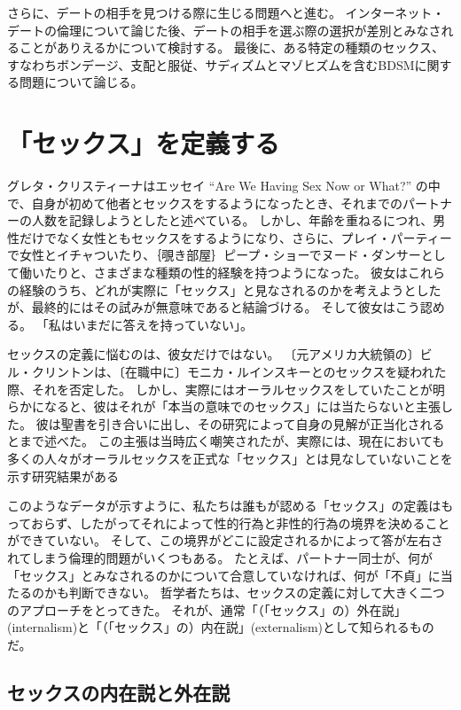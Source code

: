 \documentclass[paper=a4,book,openany]{jlreq}
\begin{document}
さらに、デートの相手を見つける際に生じる問題へと進む。
インターネット・デートの倫理について論じた後、デートの相手を選ぶ際の選択が差別とみなされることがありえるかについて検討する。
最後に、ある特定の種類のセックス、すなわちボンデージ、支配と服従、サディズムとマゾヒズムを含むBDSMに関する問題について論じる。

\section{「セックス」を定義する}

グレタ・クリスティーナはエッセイ ``Are We Having Sex Now or What?'' の中で、自身が初めて他者とセックスをするようになったとき、それまでのパートナーの人数を記録しようとしたと述べている。
しかし、年齢を重ねるにつれ、男性だけでなく女性ともセックスをするようになり、さらに、プレイ・パーティーで女性とイチャついたり、｛覗き部屋｝{ピープ・ショー}でヌード・ダンサーとして働いたりと、さまざまな種類の性的経験を持つようになった。
彼女はこれらの経験のうち、どれが実際に「セックス」と見なされるのかを考えようとしたが、最終的にはその試みが無意味であると結論づける。
そして彼女はこう認める。
「私はいまだに答えを持っていない」\nocite{christina92:_are_we_havin}。

セックスの定義に悩むのは、彼女だけではない。
〔元アメリカ大統領の〕ビル・クリントンは、〔在職中に〕モニカ・ルインスキーとのセックスを疑われた際、それを否定した。
しかし、実際にはオーラルセックスをしていたことが明らかになると、彼はそれが「本当の意味でのセックス」には当たらないと主張した。
彼は聖書を引き合いに出し、その研究によって自身の見解が正当化されるとまで述べた。
この主張は当時広く嘲笑されたが、実際には、現在においても多くの人々がオーラルセックスを正式な「セックス」とは見なしていないことを示す研究結果がある\citep{dotson-blake12:_explor_social_sexual}

このようなデータが示すように、私たちは誰もが認める「セックス」の定義はもっておらず、したがってそれによって性的行為と非性的行為の境界を決めることができていない。
そして、この境界がどこに設定されるかによって答が左右されてしまう倫理的問題がいくつもある。
たとえば、パートナー同士が、何が「セックス」とみなされるのかについて合意していなければ、何が「不貞」に当たるのかも判断できない。
哲学者たちは、セックスの定義に対して大きく二つのアプローチをとってきた。
それが、通常「（「セックス」の）外在説」(internalism)と「（「セックス」の）内在説」(externalism)として知られるものだ。

\subsection{セックスの内在説と外在説}
\end{document}
